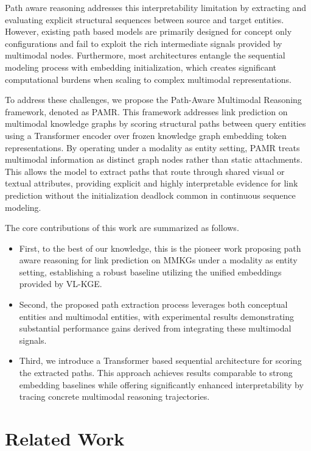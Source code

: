 \documentclass[runningheads]{llncs}
\begin{document}
Path aware reasoning addresses this interpretability limitation by extracting and evaluating explicit structural sequences between source and target entities. However, existing path based models are primarily designed for concept only configurations and fail to exploit the rich intermediate signals provided by multimodal nodes. Furthermore, most architectures entangle the sequential modeling process with embedding initialization, which creates significant computational burdens when scaling to complex multimodal representations.

To address these challenges, we propose the Path-Aware Multimodal Reasoning framework, denoted as PAMR. This framework addresses link prediction on multimodal knowledge graphs by scoring structural paths between query entities using a Transformer encoder over frozen knowledge graph embedding token representations. By operating under a modality as entity setting, PAMR treats multimodal information as distinct graph nodes rather than static attachments. This allows the model to extract paths that route through shared visual or textual attributes, providing explicit and highly interpretable evidence for link prediction without the initialization deadlock common in continuous sequence modeling.

The core contributions of this work are summarized as follows.

\begin{itemize}
  \item First, to the best of our knowledge, this is the pioneer work proposing path aware reasoning for link prediction on MMKGs under a modality as entity setting, establishing a robust baseline utilizing the unified embeddings provided by VL-KGE.
  \item Second, the proposed path extraction process leverages both conceptual entities and multimodal entities, with experimental results demonstrating substantial performance gains derived from integrating these multimodal signals.
  \item Third, we introduce a Transformer based sequential architecture for scoring the extracted paths. This approach achieves results comparable to strong embedding baselines while offering significantly enhanced interpretability by tracing concrete multimodal reasoning trajectories.
\end{itemize}

\section{Related Work}
\label{sec:related-work}
\end{document}
